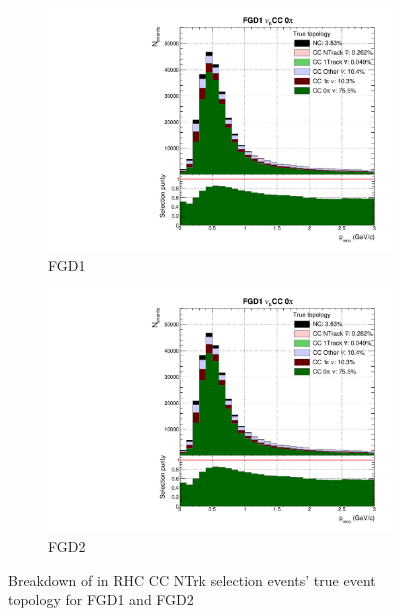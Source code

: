 \begin{figure}[h]
	\begin{subfigure}[t]{0.49\textwidth}
		\includegraphics[width=\textwidth,page=23, trim={0mm 0mm 0mm 9mm}, clip]{figures/mach3/selection/2017b_Diag_WithSelection}
		\caption{FGD1}
	\end{subfigure}
	\begin{subfigure}[t]{0.49\textwidth}
		\includegraphics[width=\textwidth,page=27, trim={0mm 0mm 0mm 9mm}, clip]{figures/mach3/selection/2017b_Diag_WithSelection}
		\caption{FGD2}
	\end{subfigure}
	\caption{Breakdown of \numu in RHC CC NTrk selection events' true event topology for FGD1 and FGD2 }
	\label{fig:ccnubarnuNtrk_topology}
\end{figure}

